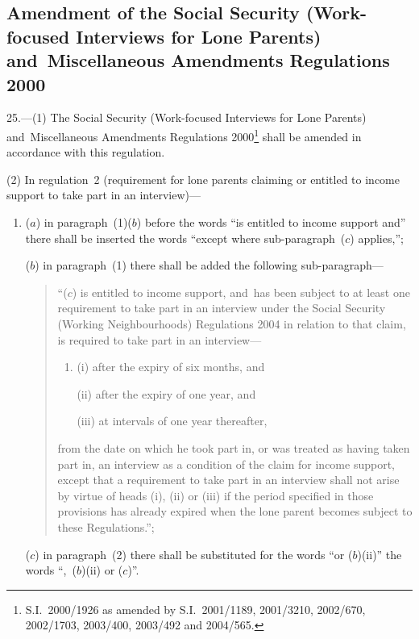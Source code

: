\documentclass[12pt,a4paper]{article}
\begin{document}
\subsection[25. Amendment of the Social Security (Work-focused Interviews for Lone Parents) and~Miscellaneous Amendments Regulations 2000]{Amendment of the Social Security (Work-focused Interviews for Lone Parents) and~Miscellaneous Amendments Regulations 2000}

25.---(1)  The Social Security (Work-focused Interviews for Lone Parents) and~Miscellaneous Amendments Regulations 2000\footnote{S.I.~2000/1926 as amended by S.I.~2001/1189, 2001/3210, 2002/670, 2002/1703, 2003/400, 2003/492 and 2004/565.} shall be amended in accordance with this regulation.

(2) In regulation~2 (requirement for lone parents claiming or entitled to income support to take part in an interview)—
\begin{enumerate}\item[]
($a$) in paragraph~(1)($b$)  before the words “is entitled to income support and” there shall be inserted the words “except where sub-paragraph~($c$)  applies,”;

($b$) in paragraph~(1) there shall be added the following sub-paragraph—
\begin{quotation}
“($c$) is entitled to income support, and~has been subject to at least one requirement to take part in an interview under the Social Security (Working Neighbourhoods) Regulations 2004 in relation to that claim, is required to take part in an interview—
\begin{enumerate}\item[]
(i) after the expiry of six months, and

(ii) after the expiry of one year, and

(iii) at intervals of one year thereafter,
\end{enumerate}
from the date on which he took part in, or was treated as having taken part in, an interview as a condition of the claim for income support, except that a requirement to take part in an interview shall not arise by virtue of heads (i), (ii)  or (iii)  if the period specified in those provisions has already expired when the lone parent becomes subject to these Regulations.”;
\end{quotation}

($c$) in paragraph~(2) there shall be substituted for the words “or ($b$)(ii)” the words “,~($b$)(ii)  or ($c$)”.
\end{enumerate}
\end{document}
